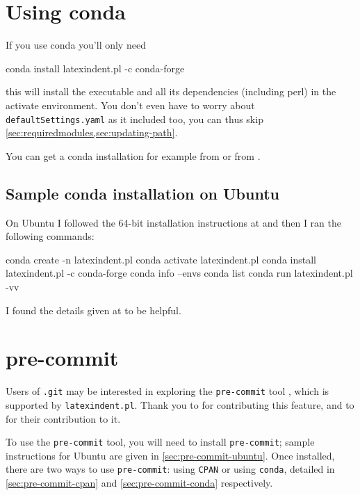  \section{Using conda}\label{sec:app:conda}
  If you use conda you'll only need
  \begin{commandshell}
conda install latexindent.pl -c conda-forge
\end{commandshell}
  this will install the executable and all its dependencies (including perl) in the
  activate environment. You don't even have to worry about \texttt{defaultSettings.yaml} as
  it included too, you can thus skip \cref{sec:requiredmodules,sec:updating-path}.

  You can get a conda installation for example from \cite{conda} or from \cite{anacoda}.

 \subsection{Sample conda installation on Ubuntu}
  On Ubuntu I followed the 64-bit installation instructions at \cite{condainstallubuntu}
  and then I ran the following commands:
  \begin{commandshell}
conda create -n latexindent.pl
conda activate latexindent.pl
conda install latexindent.pl -c conda-forge
conda info --envs
conda list
conda run latexindent.pl -vv
\end{commandshell}
  I found the details given at \cite{condainstallhelp} to be helpful.

 \section{pre-commit}

  Users of \texttt{.git} may be interested  in exploring the \texttt{pre-commit} tool \cite{pre-commithome}, which is
  supported by \texttt{latexindent.pl}. Thank you to \cite{tdegeusprecommit} for
  contributing this feature, and to \cite{holzhausprecommit} for their contribution to it.

  To use the \texttt{pre-commit} tool, you will need to install \texttt{pre-commit}; sample
  instructions for Ubuntu are given in \cref{sec:pre-commit-ubuntu}. Once installed, there
  are two ways to use \texttt{pre-commit}: using \texttt{CPAN} or using \texttt{conda},
  detailed in \cref{sec:pre-commit-cpan} and \cref{sec:pre-commit-conda} respectively.


